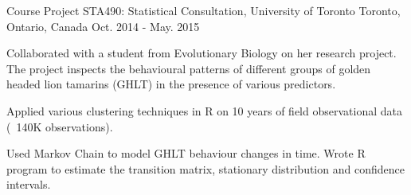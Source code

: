 

\begin{cventries}

  \cventry
    {Course Project} %
    {STA490: Statistical Consultation, University of Toronto} %
    {Toronto, Ontario, Canada} %
    {Oct. 2014 - May. 2015} %
    {
      \begin{cvitems} %
        \item {Collaborated with a student from Evolutionary Biology on her research project. The project inspects the behavioural patterns of different groups of golden headed lion tamarins (GHLT) in the presence of various predictors.}\\ 
        \begin{cvitems} 
          \item {Applied various clustering techniques in R on 10 years of field observational data (~140K observations).}
          \item {Used Markov Chain to model GHLT behaviour changes in time. Wrote R program to estimate the transition matrix, stationary distribution and confidence intervals.}\\
        \end{cvitems}
      \end{cvitems}
    }

\end{cventries}
